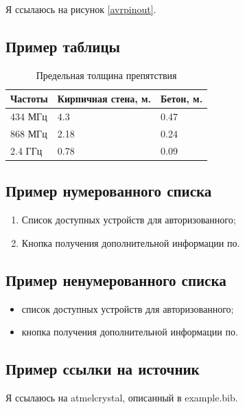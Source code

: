 \documentclass[a4paper,14pt]{extarticle}
\begin{document}
Я ссылаюсь на рисунок \ref{avrpinout}.

\subsection{Пример таблицы}

\begin{table}[H]
\caption{Предельная толщина препятствия}
\label{penetration}
\begin{tabular}{|l|l|l|}
\hline
\textbf{Частоты} & \textbf{Кирпичная стена, м.} & \textbf{Бетон, м.} \\ \hline
434 МГц & 4.3                 & 0.47      \\ \hline
868 МГц & 2.18                & 0.24      \\ \hline
2.4 ГГц & 0.78                & 0.09      \\ \hline
\end{tabular}
\end{table}

\subsection{Пример нумерованного списка}

\begin{enumerate}
  \item Список доступных устройств для авторизованного;
  \item Кнопка получения дополнительной информации по.
\end{enumerate}

\subsection{Пример ненумерованного списка}

\begin{itemize}
  \item список доступных устройств для авторизованного;
  \item кнопка получения дополнительной информации по.
\end{itemize}

\subsection{Пример ссылки на источник}

Я ссылаюсь на atmelcrystal, описанный в example.bib. \cite{atmelcrystal}

\newpage
\end{document}
